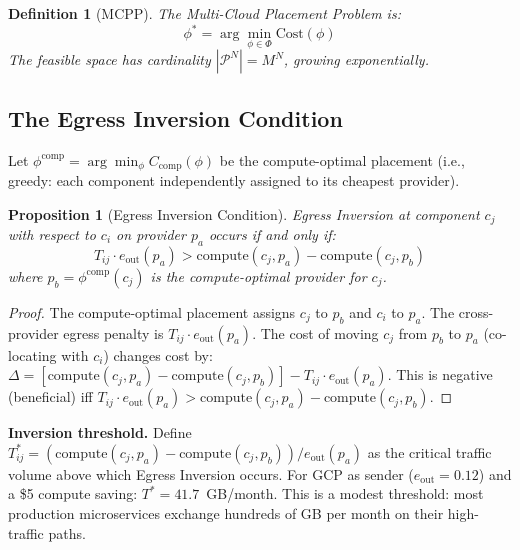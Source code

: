 \documentclass[10pt,journal]{IEEEtran}
\newtheorem{definition}{Definition}
\newtheorem{proposition}[theorem]{Proposition}
\begin{document}
\begin{definition}[MCPP]\label{def:mcpp}
The Multi-Cloud Placement Problem is:
\begin{equation}\label{eq:mcpp}
\phi^* = \arg\min_{\phi \in \Phi} \mathrm{Cost}(\phi)
\end{equation}
The feasible space has cardinality $|\mathcal{P}^N| = M^N$, growing exponentially.
\end{definition}

\subsection{The Egress Inversion Condition}

Let $\phi^{\text{comp}} = \arg\min_\phi C_\text{comp}(\phi)$ be the compute-optimal
placement (i.e., greedy: each component independently assigned to its cheapest
provider).

\begin{proposition}[Egress Inversion Condition]\label{prop:inv}
Egress Inversion at component $c_j$ with respect to $c_i$ on provider $p_a$ occurs
if and only if:
\begin{equation}\label{eq:inv_cond}
T_{ij} \cdot e_{\text{out}}(p_a) > \text{compute}(c_j, p_a) - \text{compute}(c_j, p_b)
\end{equation}
where $p_b = \phi^{\text{comp}}(c_j)$ is the compute-optimal provider for $c_j$.
\end{proposition}
\begin{proof}
The compute-optimal placement assigns $c_j$ to $p_b$ and $c_i$ to $p_a$.
The cross-provider egress penalty is $T_{ij} \cdot e_{\text{out}}(p_a)$.
The cost of moving $c_j$ from $p_b$ to $p_a$ (co-locating with $c_i$) changes
cost by:
$\Delta = [\text{compute}(c_j,p_a) - \text{compute}(c_j,p_b)] - T_{ij} \cdot e_{\text{out}}(p_a)$.
This is negative (beneficial) iff $T_{ij} \cdot e_{\text{out}}(p_a) >
\text{compute}(c_j,p_a) - \text{compute}(c_j,p_b)$.
\end{proof}

\textbf{Inversion threshold.}
Define $T_{ij}^* = (\text{compute}(c_j,p_a) - \text{compute}(c_j,p_b)) / e_{\text{out}}(p_a)$
as the critical traffic volume above which Egress Inversion occurs.
For GCP as sender ($e_{\text{out}} = 0.12$) and a \$5 compute saving: $T^* = 41.7$~GB/month.
This is a modest threshold: most production microservices exchange hundreds of GB
per month on their high-traffic paths.
\end{document}

